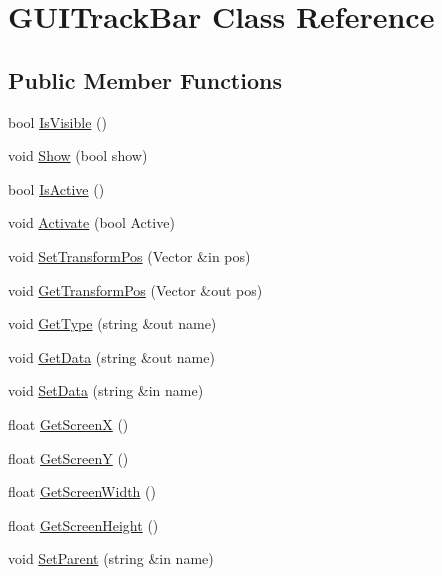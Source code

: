 \hypertarget{class_g_u_i_track_bar}{}\section{G\+U\+I\+Track\+Bar Class Reference}
\label{class_g_u_i_track_bar}
\subsection*{Public Member Functions}
\begin{DoxyCompactItemize}
\item 
bool \hyperlink{class_g_u_i_track_bar_a6000abcac14c68404cf40208c5e025e8}{Is\+Visible} ()
\item 
void \hyperlink{class_g_u_i_track_bar_ab1ca3c29142944b50ba8f075f781817b}{Show} (bool show)
\item 
bool \hyperlink{class_g_u_i_track_bar_aba2a6854a2821e237d29ce31b2f8d2b5}{Is\+Active} ()
\item 
void \hyperlink{class_g_u_i_track_bar_a8ff92f9ee55fbb4bd6c4fccc2c7f7f0e}{Activate} (bool Active)
\item 
void \hyperlink{class_g_u_i_track_bar_aefb9e73a2fef399318cf019a58aa27f2}{Set\+Transform\+Pos} (Vector \&in pos)
\item 
void \hyperlink{class_g_u_i_track_bar_a25d94c2f66c2fee602537935c5132108}{Get\+Transform\+Pos} (Vector \&out pos)
\item 
void \hyperlink{class_g_u_i_track_bar_a761ae0357671e8e80cf353c803487b2b}{Get\+Type} (string \&out name)
\item 
void \hyperlink{class_g_u_i_track_bar_a4a023c9519cd7255e7d4aea1dcc90e6c}{Get\+Data} (string \&out name)
\item 
void \hyperlink{class_g_u_i_track_bar_ab2add0508ebba5aa73a2d1168d402f24}{Set\+Data} (string \&in name)
\item 
float \hyperlink{class_g_u_i_track_bar_a0dd72098070247b458c456bf1d77d3c8}{Get\+ScreenX} ()
\item 
float \hyperlink{class_g_u_i_track_bar_a2408eaab28927a9c2d8dc5a2b0b4516c}{Get\+ScreenY} ()
\item 
float \hyperlink{class_g_u_i_track_bar_a7270bf50d1cbcaf75f7b421d4761362c}{Get\+Screen\+Width} ()
\item 
float \hyperlink{class_g_u_i_track_bar_ac2ef1d8f2644d2e4d2c0ffb7eb595a01}{Get\+Screen\+Height} ()
\item 
void \hyperlink{class_g_u_i_track_bar_ae3e494c81a9fb503417e0b1f5b2547c5}{Set\+Parent} (string \&in name)

\end{DoxyCompactItemize}
